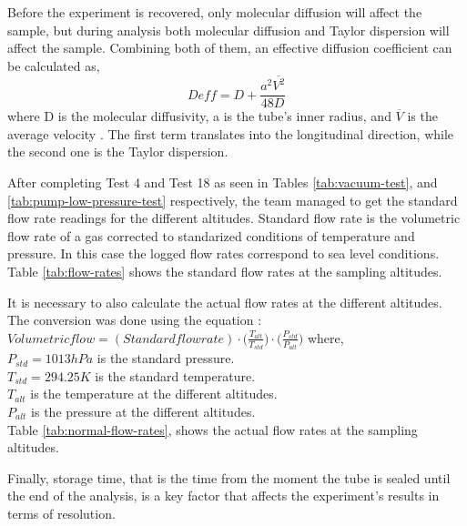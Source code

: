 Before the experiment is recovered, only molecular diffusion will affect the sample, but during analysis both molecular diffusion and Taylor dispersion will affect the sample. Combining both of them, an effective diffusion coefficient can be calculated as,
 \begin{equation}
     D{eff} = D + \frac{a^2\overline{V^2}}{48D}
 \end{equation}
where D is the molecular diffusivity, a is the tube's inner radius, and $\overline{V}$ is the average velocity \cite{Membrive}. The first term translates into the longitudinal direction, while the second one is the Taylor dispersion. 

After completing Test 4 and Test 18 as seen in Tables \ref{tab:vacuum-test}, and \ref{tab:pump-low-pressure-test} respectively, the team managed to get the standard flow rate readings for the different altitudes. Standard flow rate is the volumetric flow rate of a gas corrected to standarized conditions of temperature and pressure. In this case the logged flow rates correspond to sea level conditions. Table \ref{tab:flow-rates} shows the standard flow rates at the sampling altitudes.  



It is necessary to also calculate the actual flow rates at the different altitudes. The conversion was done using the equation \cite{flowrateswebsite}:
$ Volumetric flow = (Standard flow rate) \cdot \Big(\frac{T_{alt}}{T_{std}}\Big) \cdot \Big(\frac{P_{std}}{P_{alt}}\Big) $
where, \\
$P_{std}= 1013 hPa$ is the standard pressure. \\
$T_{std}=294.25K$ is the standard temperature.\\
$T_{alt}$ is the temperature at the different altitudes.\\
$P_{alt}$ is the pressure at the different altitudes.\\

Table \ref{tab:normal-flow-rates}, shows the actual flow rates at the sampling altitudes.



Finally, storage time, that is the time from the moment the tube is sealed until the end of the analysis, is a key factor that affects the experiment's results in terms of resolution.

